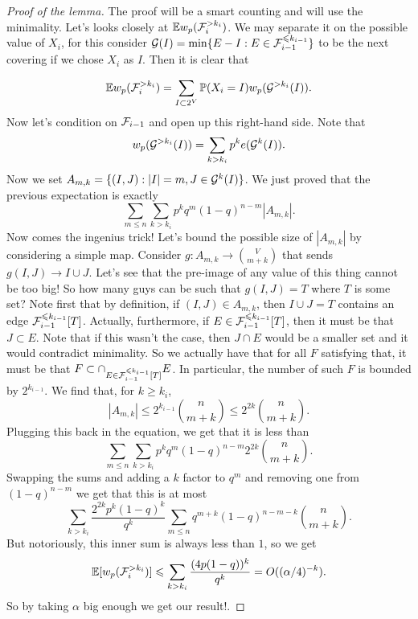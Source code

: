 \begin{proof}[Proof of the lemma]
	The proof will be a smart counting and will use the minimality.
	Let's looks closely
	at $\mathbb{E} w_p(\mathcal{F}_i^{>k_i})$. We may separate it on the possible value of $X_i$,
	for this consider $\mathcal{G}(I) = \min \{E - I: E \in \mathcal{F}_{i-1}^{\leqslant
	k_{i-1}}\}$ to be the next
	covering if we chose $X_i$ as $I$. Then it is clear that

	\[
		\mathbb{E} w_p(\mathcal{F}_i^{>k_i}) = \sum_{I \subset 2^V} \mathbb{P}(X_i = I) w_p(\mathcal{G}^{>k_i}(I)).
	\]
	Now let's condition on $\mathcal{F}_{i-1}$ and open up this right-hand side.
	Note that
	\[
		w_p(\mathcal{G}^{> k_i}(I)) = \sum_{k > k_i} p^k e(\mathcal{G}^{k}(I)).
	\]
	Now we set $A_{m,k} = \{(I,J) : |I| = m, J \in \mathcal{G}^{k}(I)\}$. We
	just proved that
	the previous expectation is exactly
	\[
		\sum_{m \leq n}  \sum_{k > k_i} p^k q^m(1-q)^{n-m} |A_{m,k}|.
	\]
	Now comes the ingenius trick! Let's bound the possible size of
	$|A_{m,k}|$ by considering a simple map.
	Consider $g : A_{m,k} \to \binom{V}{m + k}$ that sends $g(I,J) \to I
	\cup J$. Let's see that
	the pre-image of any value of this thing cannot be too big! So how
	many guys can be such that
	$g(I,J) = T$ where $T$ is some set? Note first that by definition,
	if $(I,J) \in A_{m,k}$,
	then $I \cup J = T$ contains an edge $\mathcal{F}_{i-1}^{\leqslant k_{i-1}}[T]$.
	Actually, furthermore,
	if $E \in \mathcal{F}_{i-1}^{\leqslant k_{i-1}}[T]$, then it must be that $J
	\subset E$. Note that if this wasn't the case,
	then $J \cap E$ would be a smaller set and it would contradict
	minimality. So we actually have that
	for all $F$ satisfying that, it must be that $F \subset \cap_{E \in
	\mathcal{F}_{i-1}^{\leqslant k_{i-1}}[T]} E$.
	In particular, the number of such $F$ is bounded by $2^{k_{i-1}}$.
	We find that, for $k \geq k_i$,
	\begin{equation}
		\label{kk:eq:switching}
		|A_{m,k}| \leq 2^{k_{i-1}}\binom{n}{m  + k} \leq 2^{2k}\binom{n}{m + k}.	
	\end{equation}
	Plugging this back in the equation, we get that it is less than
	\[
		\sum_{m \leq n} \sum_{k > k_i} p^k q^{m}(1-q)^{n-m}2^{2k} \binom{n}{m+k}.
	\]
	Swapping the sums and adding a $k$ factor to $q^m$ and removing one
	from $(1-q)^{n - m}$
	we get that this is at most
	\[
		\sum_{k > k_i} \frac{2^{2k}p^k(1-q)^k}{q^k} \sum_{m \leq n} q^{m+k}
		(1-q)^{n - m - k} \binom{n}{m + k}.
	\]
	But notoriously, this inner sum is always less than $1$, so we get
	\[
		\mathbb{E}[w_p(\mathcal{F}_i^{> k_i})] \leqslant \sum_{k > k_i} \frac{(4p(1-q))^k}{q^k}
		= O((\alpha/4)^{-k}).
	\]
	So by taking $\alpha$ big enough we get our result!.
\end{proof}

